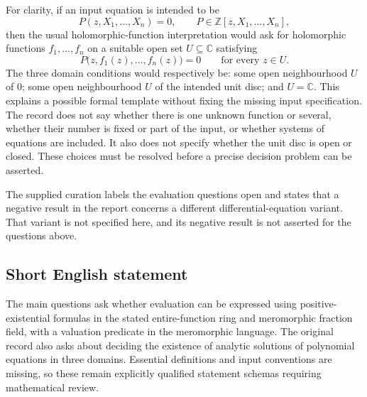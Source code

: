 \documentclass[11pt]{article}
\newcommand{\Z}{\mathbb{Z}}
\newcommand{\C}{\mathbb{C}}
\begin{document}
For clarity, if an input equation is intended to be
\[
P(z,X_1,\ldots,X_n)=0,
\qquad P\in\Z[z,X_1,\ldots,X_n],
\]
then the usual holomorphic-function interpretation would ask for holomorphic functions \(f_1,\ldots,f_n\) on a suitable open set \(U\subseteq\C\) satisfying
\[
P\bigl(z,f_1(z),\ldots,f_n(z)\bigr)=0
\qquad\text{for every }z\in U.
\]
The three domain conditions would respectively be: some open neighbourhood \(U\) of \(0\); some open neighbourhood \(U\) of the intended unit disc; and \(U=\C\). This explains a possible formal template without fixing the missing input specification. The record does not say whether there is one unknown function or several, whether their number is fixed or part of the input, or whether systems of equations are included. It also does not specify whether the unit disc is open or closed. These choices must be resolved before a precise decision problem can be asserted.

The supplied curation labels the evaluation questions open and states that a negative result in the report concerns a different differential-equation variant. That variant is not specified here, and its negative result is not asserted for the questions above.
\subsection{Short English statement}
The main questions ask whether evaluation can be expressed using positive-existential formulas in the stated entire-function ring and meromorphic fraction field, with a valuation predicate in the meromorphic language. The original record also asks about deciding the existence of analytic solutions of polynomial equations in three domains. Essential definitions and input conventions are missing, so these remain explicitly qualified statement schemas requiring mathematical review.
\end{document}
